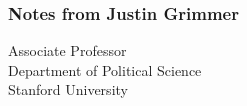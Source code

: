  \begin{frame}[fragile] \frametitle{Notes from Justin Grimmer}
Associate Professor\\Department of Political Science \\  Stanford University
\end{frame}

%
%


